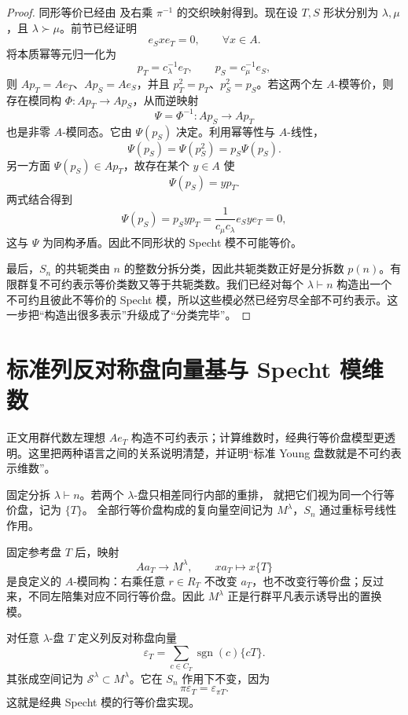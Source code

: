 \begin{proof}
同形等价已经由  及右乘 $\pi^{-1}$ 的交织映射得到。现在设 $T,S$ 形状分别为 $\lambda,\mu$，且 $\lambda\succ\mu$。前节已经证明
\[
e_Sxe_T=0,
\qquad \forall x\in A.
\]
将本质幂等元归一化为
\[
p_T=c_\lambda^{-1}e_T,
\qquad
p_S=c_\mu^{-1}e_S,
\]
则 $Ap_T=Ae_T$、$Ap_S=Ae_S$，并且 $p_T^2=p_T$、$p_S^2=p_S$。若这两个左 $A$-模等价，则存在模同构 $\Phi:Ap_T\to Ap_S$，从而逆映射
\[
\Psi=\Phi^{-1}:Ap_S\to Ap_T
\]
也是非零 $A$-模同态。它由 $\Psi(p_S)$ 决定。利用幂等性与 $A$-线性，
\[
\Psi(p_S)=\Psi(p_S^2)=p_S\Psi(p_S).
\]
另一方面 $\Psi(p_S)\in Ap_T$，故存在某个 $y\in A$ 使
\[
\Psi(p_S)=yp_T.
\]
两式结合得到
\[
\Psi(p_S)=p_Syp_T
=\frac{1}{c_\mu c_\lambda}e_Sye_T=0,
\]
这与 $\Psi$ 为同构矛盾。因此不同形状的 Specht 模不可能等价。

最后，$S_n$ 的共轭类由 $n$ 的整数分拆分类，因此共轭类数正好是分拆数 $p(n)$。有限群复不可约表示等价类数又等于共轭类数。我们已经对每个 $\lambda\vdash n$ 构造出一个不可约且彼此不等价的 Specht 模，所以这些模必然已经穷尽全部不可约表示。这一步把“构造出很多表示”升级成了“分类完毕”。
\end{proof}

\section{标准列反对称盘向量基与 Specht 模维数}

正文用群代数左理想 $Ae_T$ 构造不可约表示；计算维数时，经典行等价盘模型更透明。这里把两种语言之间的关系说明清楚，并证明“标准 Young 盘数就是不可约表示维数”。

\begin{definition}[行等价盘模]
固定分拆 $\lambda\vdash n$。若两个 $\lambda$-盘只相差同行内部的重排，
就把它们视为同一个行等价盘，记为 $\{T\}$。
全部行等价盘构成的复向量空间记为 $M^\lambda$，$S_n$ 通过重标号线性作用。
\end{definition}

固定参考盘 $T$ 后，映射
\[
A a_T\longrightarrow M^\lambda,
\qquad
x a_T\longmapsto x\{T\}
\]
是良定义的 $A$-模同构：右乘任意 $r\in R_T$ 不改变 $a_T$，也不改变行等价盘；反过来，不同左陪集对应不同行等价盘。因此 $M^\lambda$ 正是行群平凡表示诱导出的置换模。

对任意 $\lambda$-盘 $T$ 定义列反对称盘向量
\begin{equation}
\varepsilon_T
=\sum_{c\in C_T}\operatorname{sgn}(c)\{cT\}.
\label{eq:polytabloid-app}
\end{equation}
其张成空间记为 $\mathscr S^\lambda\subset M^\lambda$。它在 $S_n$ 作用下不变，因为
\[
\pi\varepsilon_T=\varepsilon_{\pi T}.
\]
这就是经典 Specht 模的行等价盘实现。

